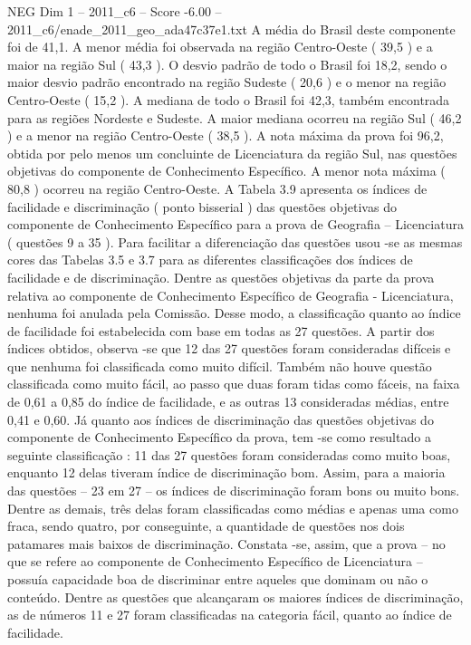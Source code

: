 \begin{textsample}{NEG Dim 1 – 2011\_c6 – Score -6.00 – 2011\_c6/enade\_2011\_geo\_ada47c37e1.txt}
A média do Brasil deste componente foi de 41,1.
A menor média foi observada na região Centro-Oeste ( 39,5 ) e a maior na região Sul ( 43,3 ).
O desvio padrão de todo o Brasil foi 18,2, sendo o maior desvio padrão encontrado na região Sudeste ( 20,6 ) e o menor na região Centro-Oeste ( 15,2 ).
A mediana de todo o Brasil foi 42,3, também encontrada para as regiões Nordeste e Sudeste.
A maior mediana ocorreu na região Sul ( 46,2 ) e a menor na região Centro-Oeste ( 38,5 ).
A nota máxima da prova foi 96,2, obtida por pelo menos um concluinte de Licenciatura da região Sul, nas questões objetivas do componente de Conhecimento Específico.
A menor nota máxima ( 80,8 ) ocorreu na região Centro-Oeste.
A Tabela 3.9 apresenta os índices de facilidade e discriminação ( ponto bisserial ) das questões objetivas do componente de Conhecimento Específico para a prova de Geografia – Licenciatura ( questões 9 a 35 ).
Para facilitar a diferenciação das questões usou -se as mesmas cores das Tabelas 3.5 e 3.7 para as diferentes classificações dos índices de facilidade e de discriminação.
Dentre as questões objetivas da parte da prova relativa ao componente de Conhecimento Específico de Geografia - Licenciatura, nenhuma foi anulada pela Comissão.
Desse modo, a classificação quanto ao índice de facilidade foi estabelecida com base em todas as 27 questões.
A partir dos índices obtidos, observa -se que 12 das 27 questões foram consideradas difíceis e que nenhuma foi classificada como muito difícil.
Também não houve questão classificada como muito fácil, ao passo que duas foram tidas como fáceis, na faixa de 0,61 a 0,85 do índice de facilidade, e as outras 13 consideradas médias, entre 0,41 e 0,60.
Já quanto aos índices de discriminação das questões objetivas do componente de Conhecimento Específico da prova, tem -se como resultado a seguinte classificação : 11 das 27 questões foram consideradas como muito boas, enquanto 12 delas tiveram índice de discriminação bom.
Assim, para a maioria das questões – 23 em 27 – os índices de discriminação foram bons ou muito bons.
Dentre as demais, três delas foram classificadas como médias e apenas uma como fraca, sendo quatro, por conseguinte, a quantidade de questões nos dois patamares mais baixos de discriminação.
Constata -se, assim, que a prova – no que se refere ao componente de Conhecimento Específico de Licenciatura – possuía capacidade boa de discriminar entre aqueles que dominam ou não o conteúdo.
Dentre as questões que alcançaram os maiores índices de discriminação, as de números 11 e 27 foram classificadas na categoria fácil, quanto ao índice de facilidade.

\end{textsample}
